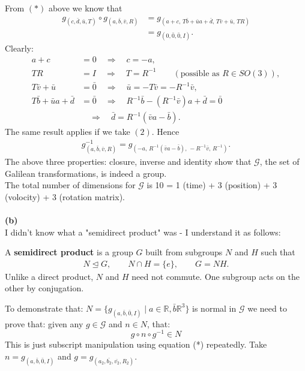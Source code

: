 \documentclass[12pt]{article}
\begin{document}
From $(*)$ above we know that
\begin{align*}
g_{(c,\bar{d},\bar{u},T)}
\circ g_{(a,\bar{b},\bar{v},R)}
&=
g_{(a+c,\,
T\bar{b}+\bar{u}a+\bar{d},\,
T\bar{v}+\bar{u},\,
TR)}\\
&=
g_{(0,\bar{0},\bar{0},I)}.
\end{align*}
Clearly:
\begin{align*}
a+c&=0
\quad\Rightarrow\quad
c=-a,\\
TR&=I
\quad\Rightarrow\quad
T=R^{-1}
\qquad
(\text{possible as }R\in SO(3)),\\
T\bar{v}+\bar{u}&=\bar{0}
\quad\Rightarrow\quad
\bar{u}=-T\bar{v}=-R^{-1}\bar{v},\\
T\bar{b}+\bar{u}a+\bar{d}&=\bar{0}
\quad\Rightarrow\quad
R^{-1}\bar{b}-(R^{-1}\bar{v})a+\bar{d}=\bar{0}\\
&\quad\Rightarrow\quad
\bar{d}=R^{-1}(\bar{v}a-\bar{b}).
\end{align*}
The same result applies if we take $(2)$. Hence
\begin{align*}
g_{(a,\bar{b},\bar{v},R)}^{-1}
=
g_{(-a,\,
R^{-1}(\bar{v}a-\bar{b}),\,
-R^{-1}\bar{v},\,
R^{-1})}.
\end{align*}
The above three properties: closure, inverse and identity show that $\mathcal{G}$, the set of Galilean transformations, is indeed a group.\\
The total number of dimensions for $\mathcal{G}$ is 10 = 1 (time) + 3 (position) + 3 (volocity) + 3 (rotation matrix).\\
\\
\noindent\textbf{(b)}\\
I didn't know what a "semidirect product" was - I understand it as follows:\\
\begin{tcolorbox}[colframe=red,coltext=red]
A \textbf{semidirect product} is a group $G$ built from subgroups $N$ and $H$ such that
\begin{align*}
N \trianglelefteq G,\qquad N\cap H=\{e\},\qquad G=NH.
\end{align*}
Unlike a direct product, $N$ and $H$ need not commute. One subgroup acts on the other by conjugation.
\end{tcolorbox}
\noindent
To demonstrate that: $N=\{g_{(a, \bar{b}, \bar{0}, I)} \; | \; a \in \mathbb{R}, \bar{b} \mathbb{R}^3  \}$ is normal in $\mathcal{G}$ we need to prove that:
given any $g \in \mathcal{G}$ and $n \in N$, that:
$$ g \circ n \circ g^{-1} \in N $$
This is just subscript manipulation using equation (*) repeatedly.  Take $n=g_{(a, \bar{b}, \bar{0}, I)}$ and $g=g_{(a_2, \bar{b_2}, \bar{v_2}, R_2)}$.
\end{document}
